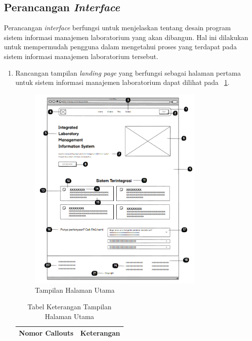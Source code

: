 \subsection{Perancangan \textit{Interface}}
Perancangan \textit{interface} berfungsi untuk menjelaskan tentang desain program sistem informasi manajemen laboratorium yang akan dibangun. Hal ini dilakukan untuk mempermudah pengguna dalam mengetahui proses yang terdapat pada sistem informasi manajemen laboratorium tersebut.

\begin{enumerate}
	\item Rancangan tampilan \textit{landing page} yang berfungsi sebagai halaman pertama untuk sistem informasi manajemen laboratorium dapat dilihat pada \pic~\ref{fig:kelola-jadwal-1}.
	      \begin{figure}
		      \centering
		      \includegraphics[width=0.82\textwidth]{konten/gambar/landing-page.png}
		      \caption{Tampilan Halaman Utama}
		      \label{fig:kelola-jadwal-1}
	      \end{figure}

	      \fontsize{11}{13}\selectfont
	      \begin{longtable}{c p{}}
		      \caption{Tabel Keterangan Tampilan Halaman Utama}                                                                                               \\
		      \hline
		      \textbf{Nomor Callouts} & \textbf{Keterangan}                                                                                                   \\
		      \hline
		      \endfirsthead


\end{longtable}
\end{enumerate}
